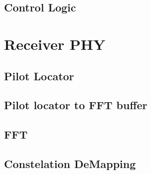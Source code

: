 \documentclass[10pt]{article}
\begin{document}
	\subsection{Control Logic}
	\label{sec:ctrl}

\section{Receiver PHY}
	\subsection{Pilot Locator}

	\subsection{Pilot locator to FFT buffer}

	\subsection{FFT}

	\subsection{Constelation DeMapping}

\end{document}
